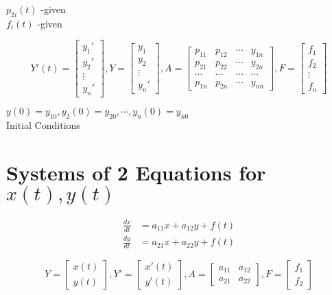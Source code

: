 \documentclass[10pt, letterpaper]{article}
\begin{document}
\noindent$p_{2i}(t)$ -given\\
$f_i(t)$ -given

\begin{equation*}
Y'(t) = 
\begin{bmatrix}
	y_1'\\
	y_2'\\
	\vdots\\
	y_n'
\end{bmatrix},
Y= \begin{bmatrix}
	y_1\\
	y_2\\
	\vdots\\
	y_n'
\end{bmatrix},
A = \begin{bmatrix}
	p_{11} & p_{12} & \cdots & y_{1n}\\
	p_{21} & p_{22} & \cdots & y_{2n}\\
	\cdots & \cdots & \cdots & \cdots\\
	p_{1n} & p_{2n} & \cdots & y_{nn}
\end{bmatrix},
F = \begin{bmatrix}
	f_1\\
	f_2\\
	\vdots\\
	f_n
\end{bmatrix}
\end{equation*}

\noindent$y(0)=y_{10}, y_2(0)=y_{20}, \cdots, y_n(0)=y_{n0}$\\
Initial Conditions

\section{Systems of 2 Equations for $x(t), y(t)$}
\begin{align*}
\frac{dx}{dt} &= a_{11}x +a_{12}y +f(t)\\
\frac{dy}{dt} &= a_{21}x +a_{22}y +f(t)
\end{align*}

\begin{equation*}
Y=\begin{bmatrix}
	x(t)\\
	y(t)
\end{bmatrix},
Y'=\begin{bmatrix}
	x'(t)\\
	y'(t)
\end{bmatrix},
A=\begin{bmatrix}
	a_{11} & a_{12}\\
	a_{21} & a_{22}
\end{bmatrix},
F=\begin{bmatrix}
	f_1\\
	f_2
\end{bmatrix}
\end{equation*}
\end{document}
